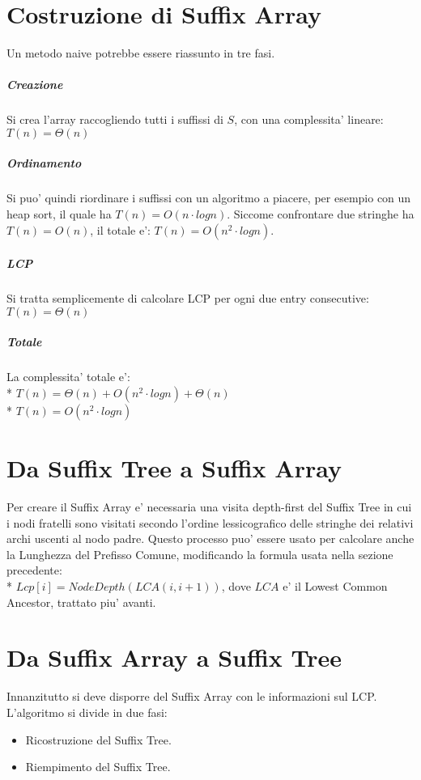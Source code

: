 \section{Costruzione di Suffix Array}

Un metodo naive potrebbe essere riassunto in tre fasi.

\subparagraph{Creazione}
Si crea l'array raccogliendo tutti i suffissi di $S$, con una complessita' lineare: $T(n) = \Theta(n)$

\subparagraph{Ordinamento}
Si puo' quindi riordinare i suffissi con un algoritmo a piacere, per esempio con un heap sort, il quale ha $T(n) = O(n \cdot log n)$.
Siccome confrontare due stringhe ha $T(n) = O(n)$, il totale e':
$T(n) = O(n^2 \cdot log n)$.

\subparagraph{LCP}
Si tratta semplicemente di calcolare LCP per ogni due entry consecutive: $T(n) = \Theta(n)$

\subparagraph{Totale}
La complessita' totale e': \\*
$T(n) = \Theta(n) + O(n^2 \cdot log n) + \Theta(n)$ \\*
$T(n) = O(n^2 \cdot log n)$

\section{Da Suffix Tree a Suffix Array}

Per creare il Suffix Array e' necessaria una visita depth-first del Suffix Tree in cui i nodi fratelli sono visitati secondo l'ordine lessicografico delle stringhe dei relativi archi uscenti al nodo padre.
Questo processo puo' essere usato per calcolare anche la Lunghezza del Prefisso Comune, modificando la formula usata nella sezione precedente: \\*
$Lcp[i] = NodeDepth(LCA(i, i+1))$, dove $LCA$ e' il Lowest Common Ancestor, trattato piu' avanti.

\section{Da Suffix Array a Suffix Tree}

Innanzitutto si deve disporre del Suffix Array con le informazioni sul LCP.
L'algoritmo si divide in due fasi: 

\begin{itemize}
\item Ricostruzione del Suffix Tree.
\item Riempimento del Suffix Tree.
\end{itemize}

